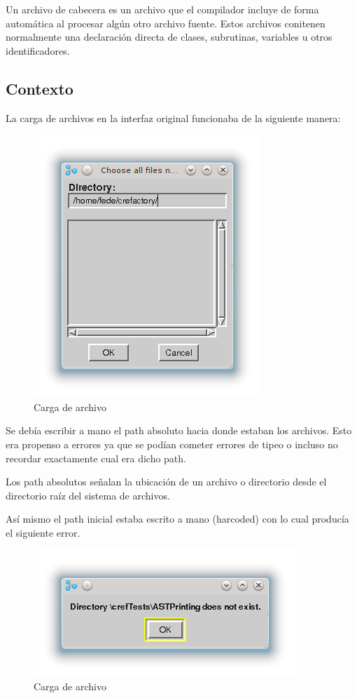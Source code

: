 \documentclass[a4paper,oneside,10pt]{article}
\begin{document}
Un archivo de cabecera es un archivo que el compilador incluye de forma automática al procesar algún otro archivo fuente. Estos archivos conitenen normalmente una declaración directa de clases, subrutinas, variables u otros identificadores.

\subsection{Contexto}
La carga de archivos en la interfaz original funcionaba de la siguiente manera:

\begin{figure}[h!]
  \centering
    \includegraphics[scale=0.85]{images/codigo_original/carga.png}
    \caption{Carga de archivo}
\end{figure}

Se deb\'ia escribir a mano el path absoluto hacia donde estaban los archivos. Esto era propenso a errores ya que se podían cometer errores de tipeo o incluso no recordar exactamente cual era dicho path.

Los path absolutos señalan la ubicación de un archivo o directorio desde el directorio raíz del sistema de archivos.

As\'i mismo el path inicial estaba escrito a mano (harcoded) con lo cual producía el siguiente error.

\begin{figure}[h!]
  \centering
    \includegraphics[scale=0.85]{images/codigo_original/error.png}
    \caption{Carga de archivo}
\end{figure}
\end{document}
